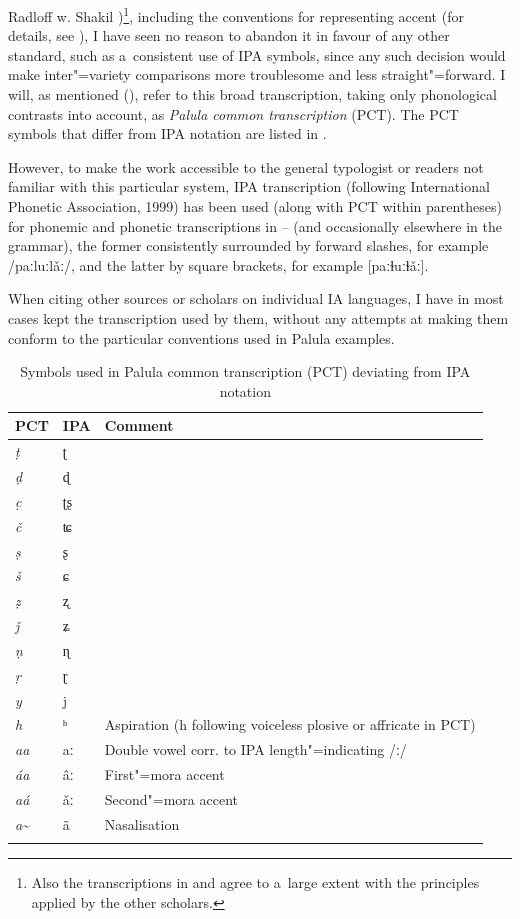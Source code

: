 {Radloff w. Shakil \citeyear{radloffshakil1998})\footnote{Also the transcriptions in
    \citet{hook1990a,hook1996} and \citet{hookzia2005} agree to a~large extent with the principles
    applied by the other scholars.}, including the conventions for representing accent (for details,
  see ), I have seen no reason to abandon it in favour of any other standard, such as
  a~consistent use of IPA symbols, since any such decision would make inter"=variety comparisons more
  troublesome and less straight"=forward. I will, as mentioned (), refer to this broad transcription, taking only phonological contrasts into account, as \textit{Palula common transcription} (PCT). The PCT symbols that differ from IPA notation are listed in .


However, to make the work accessible to the general typologist or readers not familiar with this
particular system, IPA transcription (following International Phonetic Association, 1999) has been
used (along with PCT within parentheses) for phonemic and phonetic
transcriptions in -- (and occasionally elsewhere in the grammar), the former consistently surrounded by forward slashes, for example /paːluːlǎː/, and the latter by square brackets, for example [paːɫuːɫǎː]. 


When citing other sources or scholars on individual IA languages, I have in most cases kept the
transcription used by them, without any attempts at making them conform to the particular
conventions used in Palula examples.


\begin{table}[ht]
\caption{Symbols used in Palula common transcription (PCT) deviating from IPA notation}
\begin{tabularx}{.8\textwidth}{ l l   Q }
\lsptoprule
PCT &
IPA &
Comment\\\hline
\textit{ṭ} &
ʈ &
\\
\textit{ḍ} &
ɖ &
\\
\textit{c̣} &
ʈʂ &
\\
\textit{č} &
ʨ &
\\
\textit{ṣ} &
ʂ &
\\
\textit{š} &
ɕ &
\\
\textit{ẓ} &
ʐ &
\\
\textit{ǰ} &
ʑ &\\


\textit{ṇ} &
ɳ &
\\
\textit{ṛ} &
ɽ &
\\
\textit{y} &
j &
\\
\textit{h} &
ʰ &
Aspiration (h following voiceless plosive or affricate in PCT)
\\
\textit{aa} &
aː &
Double vowel corr. to IPA length"=indicating /ː/
\\
\textit{áa} &
âː &
First"=mora accent
\\
\textit{aá} &
ǎː &
Second"=mora accent
\\
\textit{a}\textasciitilde &
ã &
Nasalisation\\\lspbottomrule
\end{tabularx}
\label{tab:1-5}
\end{table}

}
